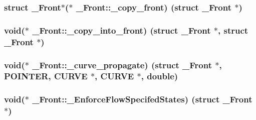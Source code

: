 \subsubsection[{\texorpdfstring{\+\_\+copy\+\_\+front}{_copy_front}}]{\setlength{\rightskip}{0pt plus 5cm}struct {\bf \+\_\+\+Front}$\ast$($\ast$ \+\_\+\+Front\+::\+\_\+copy\+\_\+front) (struct {\bf \+\_\+\+Front} $\ast$)}\hypertarget{struct___front_a08c405a5134ac96c8c1e3b7808938b25}{}\label{struct___front_a08c405a5134ac96c8c1e3b7808938b25}
\subsubsection[{\texorpdfstring{\+\_\+copy\+\_\+into\+\_\+front}{_copy_into_front}}]{\setlength{\rightskip}{0pt plus 5cm}void($\ast$ \+\_\+\+Front\+::\+\_\+copy\+\_\+into\+\_\+front) (struct {\bf \+\_\+\+Front} $\ast$, struct {\bf \+\_\+\+Front} $\ast$)}\hypertarget{struct___front_a068a374981d2bc5a6a04dc6b79616275}{}\label{struct___front_a068a374981d2bc5a6a04dc6b79616275}
\subsubsection[{\texorpdfstring{\+\_\+curve\+\_\+propagate}{_curve_propagate}}]{\setlength{\rightskip}{0pt plus 5cm}void($\ast$ \+\_\+\+Front\+::\+\_\+curve\+\_\+propagate) (struct {\bf \+\_\+\+Front} $\ast$, {\bf P\+O\+I\+N\+T\+ER}, {\bf C\+U\+R\+VE} $\ast$, {\bf C\+U\+R\+VE} $\ast$, double)}\hypertarget{struct___front_a88dc9bb33f291b0166d003ca92570c93}{}\label{struct___front_a88dc9bb33f291b0166d003ca92570c93}
\subsubsection[{\texorpdfstring{\+\_\+\+Enforce\+Flow\+Specifed\+States}{_EnforceFlowSpecifedStates}}]{\setlength{\rightskip}{0pt plus 5cm}void($\ast$ \+\_\+\+Front\+::\+\_\+\+Enforce\+Flow\+Specifed\+States) (struct {\bf \+\_\+\+Front} $\ast$)}\hypertarget{struct___front_aabe2874a809fa6a920314db6bfdd45b1}{}\label{struct___front_aabe2874a809fa6a920314db6bfdd45b1}
